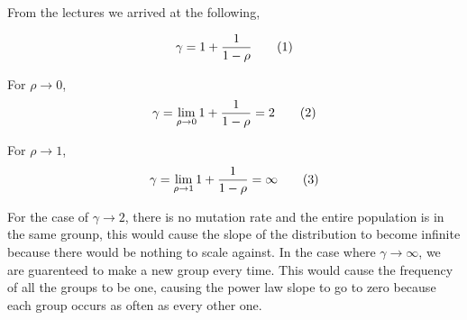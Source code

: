 From the lectures we arrived at the following,

\[
  \gamma
  =
  1 + 
  \frac{1}{
    1 - \rho
  }
  \addtag
\]

For $\rho \to 0$,
\[
  \gamma
  =
  \lim_{\rho \to 0}
  1 + 
  \frac{1}{
    1 - \rho
  }
  =
  2
  \addtag
\]

For $\rho \to 1$,
\[
  \gamma
  =
  \lim_{\rho \to 1}
  1 + 
  \frac{1}{
    1 - \rho
  }
  =
  \infty
  \addtag
\]

For the case of $\gamma \to 2$, there is no mutation rate and the entire population is in the same grounp, this would cause the slope of the distribution to become infinite because there would be nothing to scale against. In the case where $\gamma \to \infty$, we are guarenteed to make a new group every time. This would cause the frequency of all the groups to be one, causing the power law slope to go to zero because each group occurs as often as every other one.